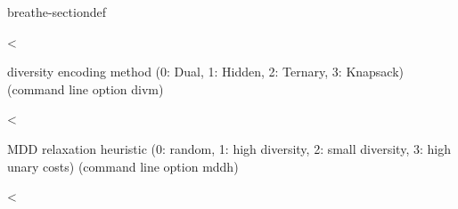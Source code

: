 \documentclass[letterpaper,10pt,openany,oneside,english]{sphinxmanual}
\begin{document}
\begin{fulllineitems}
\begin{sphinxuseclass}{breathe-sectiondef}

\begin{fulllineitems}
\label{\detokenize{ref/ref_cpp:_CPPv4N8ToulBar28divRelaxE}}\label{\detokenize{ref/ref_cpp:_CPPv3N8ToulBar28divRelaxE}}\label{\detokenize{ref/ref_cpp:_CPPv2N8ToulBar28divRelaxE}}\label{\detokenize{ref/ref_cpp:ToulBar2::divRelax__unsigned-i}}
\pysigstartsignatures
\pysigstartmultiline
{}
\pysigstopmultiline
\pysigstopsignatures
\sphinxAtStartPar
\textless{} 

\sphinxAtStartPar
diversity encoding method (0: Dual, 1: Hidden, 2: Ternary, 3: Knapsack) (command line option \sphinxhyphen{}divm) 

\end{fulllineitems}


\begin{fulllineitems}
\label{\detokenize{ref/ref_cpp:_CPPv4N8ToulBar28varOrderE}}\label{\detokenize{ref/ref_cpp:_CPPv3N8ToulBar28varOrderE}}\label{\detokenize{ref/ref_cpp:_CPPv2N8ToulBar28varOrderE}}\label{\detokenize{ref/ref_cpp:ToulBar2::varOrder__cP}}
\pysigstartsignatures
\pysigstartmultiline
{}
\pysigstopmultiline
\pysigstopsignatures
\sphinxAtStartPar
\textless{} 

\sphinxAtStartPar
MDD relaxation heuristic (0: random, 1: high diversity, 2: small diversity, 3: high unary costs) (command line option \sphinxhyphen{}mddh) 

\end{fulllineitems}


\begin{fulllineitems}
\label{\detokenize{ref/ref_cpp:_CPPv4N8ToulBar27btdModeE}}\label{\detokenize{ref/ref_cpp:_CPPv3N8ToulBar27btdModeE}}\label{\detokenize{ref/ref_cpp:_CPPv2N8ToulBar27btdModeE}}\label{\detokenize{ref/ref_cpp:ToulBar2::btdMode__i}}
\pysigstartsignatures
\pysigstartmultiline
{}
\pysigstopmultiline
\pysigstopsignatures
\sphinxAtStartPar
\textless{} 


\end{fulllineitems}
\end{sphinxuseclass}
\end{fulllineitems}
\end{document}
